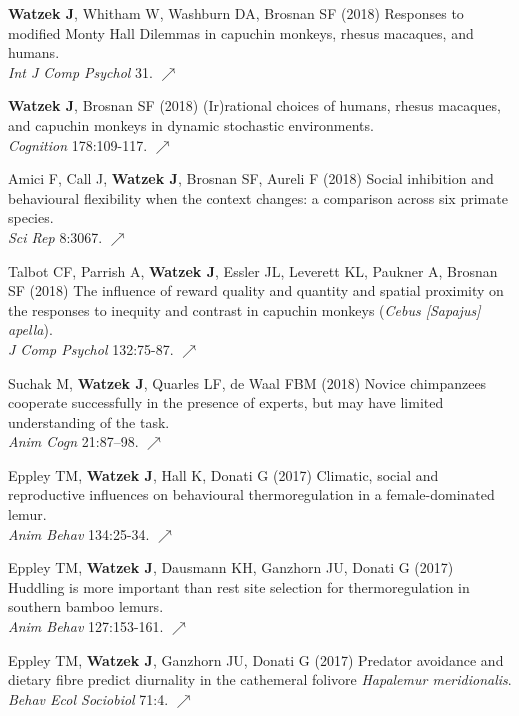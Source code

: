 \documentclass[]{friggeri-cv}
\begin{document}
\begin{enumerate}[label={[\,\arabic*\,]}]
  \item {\textbf{Watzek J}, Whitham W, Washburn DA, Brosnan SF (2018) Responses to modified Monty Hall Dilemmas in capuchin monkeys, rhesus macaques, and humans. \\\emph{Int J Comp Psychol} 31. \href{https://escholarship.org/uc/item/1jn0t21r}{\small $\nearrow$}}
  \item {\textbf{Watzek J}, Brosnan SF (2018) (Ir)rational choices of humans, rhesus macaques, and capuchin monkeys in dynamic stochastic environments. \\\emph{Cognition} 178:109-117. \href{https://doi.org/10.1016/j.cognition.2018.05.019}{\small $\nearrow$}}
  \item {Amici F, Call J, \textbf{Watzek J}, Brosnan SF, Aureli F (2018) Social inhibition and behavioural flexibility when the context changes: a comparison across six primate species. \\\emph{Sci Rep} 8:3067. \href{https://doi.org/10.1038/s41598-018-21496-6}{\small $\nearrow$}}
  \item {Talbot CF, Parrish A, \textbf{Watzek J}, Essler JL, Leverett KL, Paukner A, Brosnan SF (2018) The influence of reward quality and quantity and spatial proximity on the responses to inequity and contrast in capuchin monkeys (\emph{Cebus [Sapajus] apella}). \\\emph{J Comp Psychol} 132:75-87. \href{https://doi.org/10.1037/com0000088}{\small $\nearrow$}}
  \item {Suchak M, \textbf{Watzek J}, Quarles LF, de Waal FBM (2018) Novice chimpanzees cooperate successfully in the presence of experts, but may have limited understanding of the task. \\\emph{Anim Cogn} 21:87–98. \href{https://doi.org/10.1007/s10071-017-1142-2}{\small $\nearrow$}}
  \item {Eppley TM, \textbf{Watzek J}, Hall K, Donati G (2017) Climatic, social and reproductive influences on behavioural thermoregulation in a female-dominated lemur. \\\emph{Anim Behav} 134:25-34. \href{https://doi.org/10.1016/j.anbehav.2017.10.003}{\small $\nearrow$}}
  \item {Eppley TM, \textbf{Watzek J}, Dausmann KH, Ganzhorn JU, Donati G (2017) Huddling is more important than rest site selection for thermoregulation in southern bamboo lemurs. \\\emph{Anim Behav} 127:153-161. \href{https://doi.org/10.1016/j.anbehav.2017.03.019}{\small $\nearrow$}}
  \item {Eppley TM, \textbf{Watzek J}, Ganzhorn JU, Donati G (2017) Predator avoidance and dietary fibre predict diurnality in the cathemeral folivore \emph{Hapalemur meridionalis}. \\\emph{Behav Ecol Sociobiol} 71:4. \href{https://doi.org/10.1007/s00265-016-2247-3}{\small $\nearrow$}} 
\end{enumerate}
\end{document}
